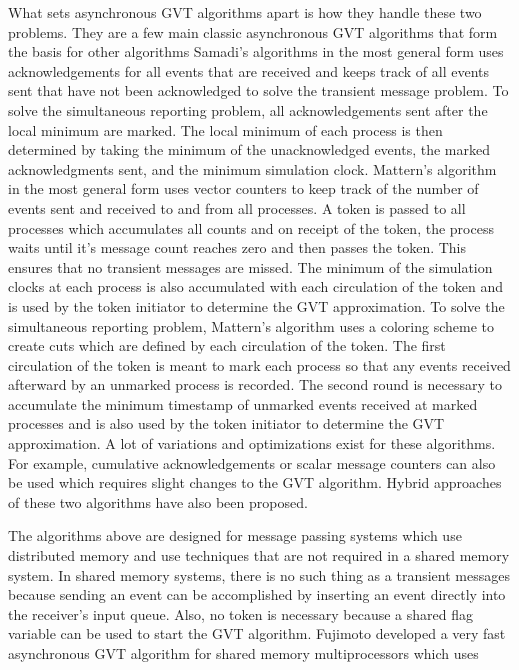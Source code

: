 \documentclass[11pt]{book}
\begin{document}
What sets asynchronous GVT algorithms apart is how they handle these two problems. They are a few
main classic asynchronous GVT algorithms that form the basis for other algorithms
Samadi’s\cite{samadi-85} algorithms in the most general form uses acknowledgements for all events
that are received and keeps track of all events sent that have not been acknowledged to solve the
transient message problem. To solve the simultaneous reporting problem, all acknowledgements sent
after the local minimum are marked. The local minimum of each process is then determined by taking
the minimum of the unacknowledged events, the marked acknowledgments sent, and the minimum
simulation clock. Mattern’s algorithm in the most general form uses vector counters to keep track
of the number of events sent and received to and from all processes. A token is passed to all
processes which accumulates all counts and on receipt of the token, the process waits until it’s
message count reaches zero and then passes the token. This ensures that no transient messages are
missed. The minimum of the simulation clocks at each process is also accumulated with each circulation
of the token and is used by the token initiator to determine the GVT approximation. To solve the
simultaneous reporting problem, Mattern’s algorithm uses a coloring scheme to create cuts which
are defined by each circulation of the token. The first circulation of the token is meant to mark
each process so that any events received afterward by an unmarked process is recorded. The second
round is necessary to accumulate the minimum timestamp of unmarked events received at marked
processes and is also used by the token initiator to determine the GVT approximation. A lot of
variations and optimizations exist for these algorithms. For example, cumulative acknowledgements
or scalar message counters can also be used which requires slight changes to the GVT algorithm.
Hybrid approaches of these two algorithms have also been proposed.

The algorithms above are designed for message passing systems which use distributed memory and use
techniques that are not required in a shared memory system. In shared memory systems, there is no
such thing as a transient messages because sending an event can be accomplished by inserting an
event directly into the receiver's input queue. Also, no token is necessary because a shared flag
variable can be used to start the GVT algorithm. Fujimoto developed a very fast asynchronous GVT
algorithm for shared memory multiprocessors which uses
\end{document}
